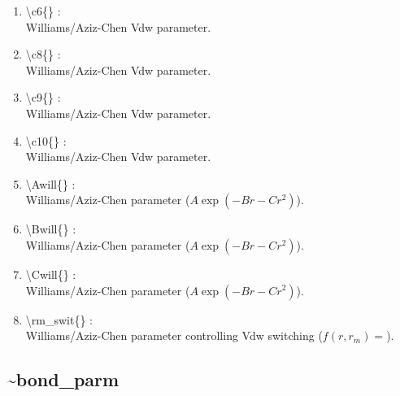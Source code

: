 \documentclass[12pt,titlepage]{article}
\begin{document}
\begin{enumerate}
 \vspace{0.15in} 
 \item  \textbackslash{}c6\{\} : \\ 
    Williams/Aziz-Chen Vdw parameter.

 \vspace{0.15in} 
 \item  \textbackslash{}c8\{\} : \\ 
    Williams/Aziz-Chen Vdw parameter.

 \vspace{0.15in} 
 \item  \textbackslash{}c9\{\} : \\ 
    Williams/Aziz-Chen Vdw parameter.

 \vspace{0.15in} 
 \item  \textbackslash{}c10\{\} : \\ 
    Williams/Aziz-Chen Vdw parameter.

 \vspace{0.15in} 
 \item  \textbackslash{}Awill\{\} : \\ 
    Williams/Aziz-Chen parameter ($A\exp(-Br-Cr^2)$).

 \vspace{0.15in} 
 \item  \textbackslash{}Bwill\{\} : \\ 
    Williams/Aziz-Chen parameter ($A\exp(-Br-Cr^2)$).

 \vspace{0.15in} 
 \item  \textbackslash{}Cwill\{\} : \\ 
    Williams/Aziz-Chen parameter ($A\exp(-Br-Cr^2)$).

 \vspace{0.15in} 
 \item  \textbackslash{}rm\_swit\{\} : \\ 
    Williams/Aziz-Chen parameter controlling Vdw switching 
   ($f(r,r_m) = $).

\end{enumerate}

\newpage
\subsection*{\bf \~{}bond\_parm}
\end{document}
